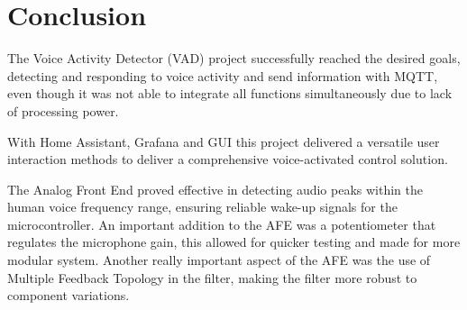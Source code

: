 \section{Conclusion}

The Voice Activity Detector (VAD) project successfully reached the desired goals, detecting and responding to voice activity and send information with MQTT, even though it was not able to integrate all functions simultaneously due to lack of processing power. 

With Home Assistant, Grafana and GUI this project delivered a versatile user interaction methods to deliver a comprehensive voice-activated control solution.

The Analog Front End proved effective in detecting audio peaks within the human voice frequency range, ensuring reliable wake-up signals for the microcontroller. An important addition to the AFE was a potentiometer that regulates the microphone gain, this allowed for quicker testing and made for more modular system. Another really important aspect of the AFE was the use of Multiple Feedback Topology in the filter, making the filter more robust to component variations.